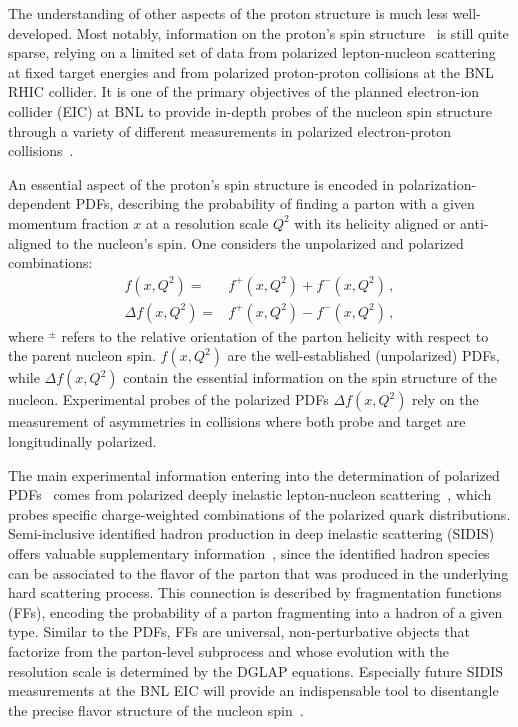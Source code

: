 \documentclass[10pt,aps,prl,twocolumn,preprintnumbers,nofootinbib]{revtex4-2}
\begin{document}
The understanding 
of other aspects of the 
proton structure is much less well-developed. Most notably, information on the proton’s spin 
structure~\cite{Aidala:2012mv} is 
still quite sparse, relying on a limited set of data from polarized lepton-nucleon scattering at fixed target
energies and from polarized proton-proton collisions at the BNL RHIC collider. It is one of the primary 
objectives of the planned electron-ion collider (EIC) at BNL to provide in-depth probes of the nucleon 
spin structure through a variety of different measurements in polarized electron-proton collisions~\cite{Accardi:2012qut}. 

An essential aspect of the proton’s spin structure is encoded in polarization-dependent PDFs,  
describing the probability of finding a parton with a given momentum fraction $x$ at a resolution 
scale $Q^2$ with its helicity aligned or anti-aligned to the nucleon’s spin. One considers the 
unpolarized and polarized combinations: 
\begin{align}
 f(x,Q^2) =& f^+(x,Q^2)+f^-(x,Q^2)\,, \nonumber\\
 \Delta f(x,Q^2)=&  f^+(x,Q^2)-f^-(x,Q^2)\,,
\end{align}
where $^\pm$ refers to the relative orientation of the parton helicity with respect to the parent nucleon spin.
$ f(x,Q^2)$ are the well-established (unpolarized) PDFs, 
while $\Delta f(x,Q^2)$ contain the essential information on the spin structure of the nucleon. 
Experimental probes of the polarized PDFs $\Delta f(x,Q^2)$ rely on the measurement of asymmetries 
 in collisions where both probe and target are longitudinally polarized. 

The main experimental information entering into the 
determination of polarized 
PDFs~\cite{Nocera:2014gqa,deFlorian:2014yva}
comes from polarized deeply 
inelastic lepton-nucleon 
scattering~\cite{EuropeanMuon:1989yki,SpinMuon:1998eqa,E142:1996thl,E143:1998hbs,E154:1997xfa,E155:2000qdr,HERMES:2006jyl,COMPASS:2015mhb}, which probes specific 
charge-weighted combinations of the polarized quark distributions. 
Semi-inclusive identified hadron production in deep inelastic scattering (SIDIS)
offers valuable supplementary 
information~\cite{SpinMuon:1997yns,COMPASS:2010hwr,HERMES:2018awh},
since the identified hadron species can be associated 
to the flavor of the parton that was produced in the underlying
hard scattering process. 
 This connection is described by fragmentation functions (FFs), encoding the probability of a parton fragmenting into a hadron of a given type. Similar to the PDFs, FFs are universal, non-perturbative objects that factorize from 
 the parton-level subprocess and whose evolution with the 
 resolution scale is 
 determined by the DGLAP 
 equations.
Especially future SIDIS measurements at the BNL EIC 
will provide an indispensable tool to 
disentangle the precise flavor structure of the 
nucleon spin~\cite{AbdulKhalek:2021gbh,Aschenauer:2019kzf}. 
\end{document}
